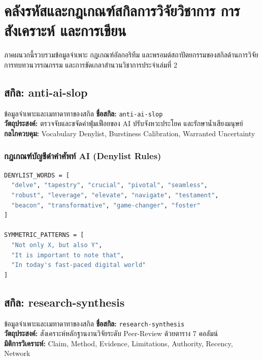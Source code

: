 \chapter{คลังรหัสและกฎเกณฑ์สกิลการวิจัยวิชาการ การสังเคราะห์ และการเขียน}

ภาคผนวกนี้รวบรวมข้อมูลจำเพาะ กฎเกณฑ์อัลกอริทึม และพรอมต์สถาปัตยกรรมของสกิลด้านการวิจัย การทบทวนวรรณกรรม และการขัดเกลาสำนวนวิชาการประจำเล่มที่ 2

\section{สกิล: anti-ai-slop}

\begin{teachingplan}{ข้อมูลจำเพาะและเมทาดาทาของสกิล}
\textbf{ชื่อสกิล:} \texttt{anti-ai-slop}\\
\textbf{วัตถุประสงค์:} ตรวจจับและขจัดคำฟุ่มเฟือยของ AI ปรับจังหวะประโยค และรักษาน้ำเสียงมนุษย์\\
\textbf{กลไกควบคุม:} Vocabulary Denylist, Burstiness Calibration, Warranted Uncertainty
\end{teachingplan}

\subsection{กฎเกณฑ์บัญชีดำคำศัพท์ AI (Denylist Rules)}

\begin{lstlisting}[language=bash, caption={Anti-AI Slop Denylist Dictionary Configuration}]
DENYLIST_WORDS = [
  "delve", "tapestry", "crucial", "pivotal", "seamless", 
  "robust", "leverage", "elevate", "navigate", "testament",
  "beacon", "transformative", "game-changer", "foster"
]

SYMMETRIC_PATTERNS = [
  "Not only X, but also Y",
  "It is important to note that",
  "In today's fast-paced digital world"
]
\end{lstlisting}

\section{สกิล: research-synthesis}

\begin{teachingplan}{ข้อมูลจำเพาะและเมทาดาทาของสกิล}
\textbf{ชื่อสกิล:} \texttt{research-synthesis}\\
\textbf{วัตถุประสงค์:} สังเคราะห์หลักฐานงานวิจัยระดับ Peer-Review ด้วยตาราง 7 คอลัมน์\\
\textbf{มิติการวิเคราะห์:} Claim, Method, Evidence, Limitations, Authority, Recency, Network
\end{teachingplan}

